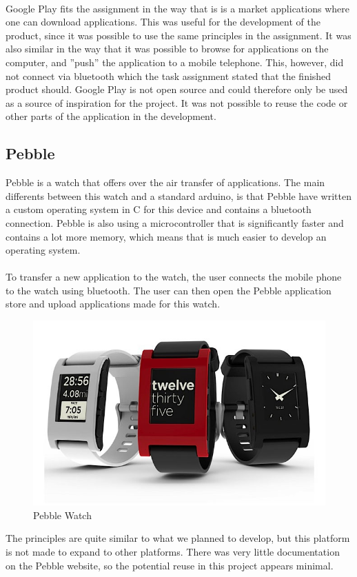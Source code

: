 \\

Google Play fits the assignment in the way that is is a market applications where one can download applications. This was useful for the development of the product, since it was possible to use the same principles in the assignment. It was also similar in the way that it was possible to browse for applications on the computer, and ''push'' the application to a mobile telephone. This, however, did not connect via bluetooth which the task assignment stated that the finished product should. Google Play is not open source and could therefore only be used as a source of inspiration for the project. It was not possible to reuse the code or other parts of the application in the development. 


\subsection{Pebble}
Pebble is a watch that offers over the air transfer of applications. The main differents between this watch and a standard arduino, is that Pebble have written a custom operating system in C for this device and contains a bluetooth connection. Pebble is also using a microcontroller that is significantly faster and contains a lot more memory, which means that is much easier to develop an operating system.\\
\\
To transfer a new application to the watch, the user connects the mobile phone to the watch using bluetooth. The user can then open the Pebble application store and upload applications made for this watch.


\begin{figure}[H]
\includegraphics[scale=0.7]{images/Pebble-Smartphone-Watch.jpeg}
\caption{Pebble Watch}
\end{figure}
The principles are quite similar to what we planned to develop, but this platform is not made to expand to other platforms. There was very little documentation on the Pebble website, so the potential reuse in this project appears minimal.

